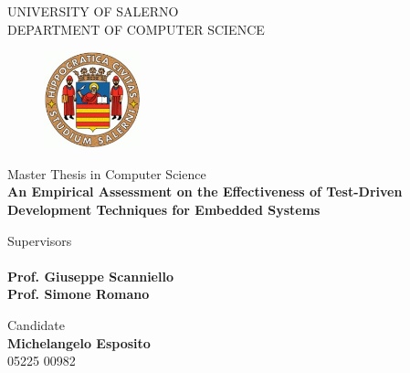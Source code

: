 \renewcommand{\baselinestretch}{1.5}  
\begin{titlepage}  
    \begin{center}
        \LARGE{\uppercase{University of Salerno}}\\
        \vspace{5mm}
    	\uppercase{\normalsize Department of Computer Science}\\
    \end{center}

    \begin{figure}
        \centering
        \includegraphics[width=0.25\textwidth]{figures/logo_standard.jpg}
    \end{figure}
    
    \begin{center}
    	\large{ Master Thesis in Computer Science }\\
    	\vspace{5mm}
        {\LARGE{\textbf{An Empirical Assessment on the Effectiveness of Test-Driven Development Techniques for Embedded Systems}}}
    	\vspace{3mm}
    \end{center}
    
    \vspace{10mm}
    \noindent
    \begin{minipage}[t]{0.60\textwidth}
    	{\large{Supervisors}}
    	\\\\
    	{\large{\textbf{Prof. Giuseppe Scanniello}}}
        \\
        {\large{ \textbf{Prof. Simone Romano}}}
    \end{minipage}
    \hfill
    \begin{minipage}[t]{0.4\textwidth}\raggedleft
    
    	{\large{Candidate \\ \textbf{Michelangelo Esposito}\\ 05225 00982}}
    \end{minipage}
    
    \vspace{50mm}
    

\end{titlepage}

\renewcommand{\baselinestretch}{1} 
